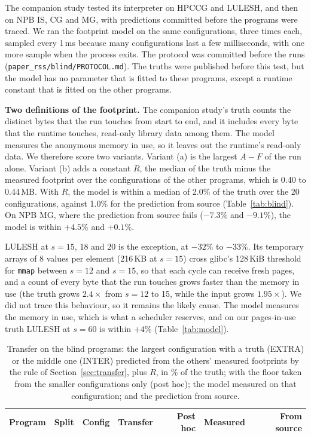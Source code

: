\documentclass[11pt]{article}
\newcommand{\secref}[1]{Section~\ref{#1}}
\newcommand{\tabref}[1]{Table~\ref{#1}}
\begin{document}
The companion study tested its interpreter on HPCCG and LULESH, and then on NPB IS, CG and MG, with predictions
committed before the programs were traced. We ran the footprint model on the same configurations, three times each,
sampled every 1\,ms because many configurations last a few milliseconds, with one more sample when the process exits.
The protocol was committed before the runs (\texttt{paper\_rss/blind/PROTOCOL.md}). The truths were published before
this test, but the model has no parameter that is fitted to these programs, except a runtime constant that is
fitted on the other programs.

\textbf{Two definitions of the footprint.} The companion study's truth counts the distinct bytes that the run touches
from start to end, and it includes every byte that the runtime touches, read-only library data among them. The model
measures the anonymous memory in use, so it leaves out the runtime's read-only data. We therefore score two variants.
Variant (a) is the largest $A - F$ of the run alone. Variant (b) adds a constant $R$, the median of the truth minus
the measured footprint over the configurations of the other programs, which is 0.40 to 0.44\,MB. With $R$, the model
is within a median of 2.0\% of the truth over the 20 configurations, against 1.0\% for the prediction from source
(\tabref{tab:blind}). On NPB MG, where the prediction from source fails ($-7.3\%$ and $-9.1\%$), the model is within
$+4.5\%$ and $+0.1\%$.

LULESH at $s = 15$, 18 and 20 is the exception, at $-32\%$ to $-33\%$. Its temporary arrays of 8 values per element
(216\,KB at $s = 15$) cross glibc's 128\,KiB threshold for \texttt{mmap} between $s = 12$ and $s = 15$, so that each
cycle can receive fresh pages, and a count of every byte that the run touches grows faster than the memory in use
(the truth grows $2.4\times$ from $s = 12$ to 15, while the input grows $1.95\times$). We did not trace this behaviour,
so it remains the likely cause. The model measures the memory in use, which is what a scheduler reserves, and on our
pages-in-use truth LULESH at $s = 60$ is within $+4\%$ (\tabref{tab:model}).

\begin{table}[!htbp]
\centering
\small
\caption{Transfer on the blind programs: the largest configuration with a truth (EXTRA) or the middle one (INTER)
predicted from the others' measured footprints by the rule of \secref{sec:transfer}, plus $R$, in \% of the truth;
with the floor taken from the smaller configurations only (post hoc); the model measured on that configuration; and
the prediction from source.}
\label{tab:blind-splits}
\setlength{\tabcolsep}{4pt}
\begin{tabular}{lllrrrr}
\toprule
Program & Split & Config & Transfer & Post hoc & Measured & From source \\
\midrule

\bottomrule
\end{tabular}
\end{table}
\end{document}
